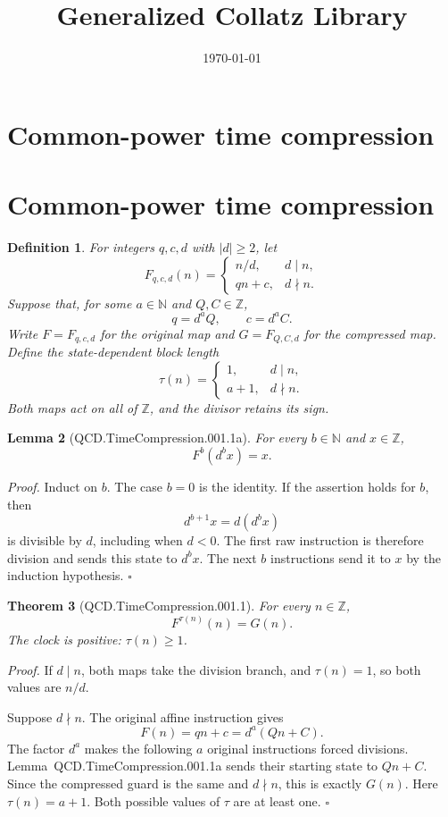 \documentclass[11pt,letterpaper]{article}
\title{Generalized Collatz Library}
\author{}
\date{\today}
\newcommand{\N}{\mathbb{N}}
\newcommand{\Z}{\mathbb{Z}}
\newtheorem{theorem}{Theorem}
\newtheorem{lemma}[theorem]{Lemma}
\newtheorem{definition}[theorem]{Definition}
\newenvironment{proof}{\noindent\textit{Proof.}}{\hfill\(\square\)}
\begin{document}
\maketitle
\section*{Common-power time compression}

\section{Common-power time compression}

\begin{definition}
For integers \(q,c,d\) with \(|d|\ge2\), let
\[
F_{q,c,d}(n)=
\begin{cases}
n/d,&d\mid n,\\
qn+c,&d\nmid n.
\end{cases}
\]
Suppose that, for some \(a\in\N\) and \(Q,C\in\Z\),
\[
q=d^aQ,
\qquad
c=d^aC.
\]
Write \(F=F_{q,c,d}\) for the original map and \(G=F_{Q,C,d}\) for the
compressed map. Define the state-dependent block length
\[
\tau(n)=
\begin{cases}
1,&d\mid n,\\
a+1,&d\nmid n.
\end{cases}
\]
Both maps act on all of \(\Z\), and the divisor retains its sign.
\end{definition}

\begin{lemma}[QCD.TimeCompression.001.1a]
For every \(b\in\N\) and \(x\in\Z\),
\[
F^b(d^b x)=x.
\]
\end{lemma}
\begin{proof}
Induct on \(b\). The case \(b=0\) is the identity. If the assertion holds for
\(b\), then
\[
d^{b+1}x=d(d^b x)
\]
is divisible by \(d\), including when \(d<0\). The first raw instruction is
therefore division and sends this state to \(d^b x\). The next \(b\)
instructions send it to \(x\) by the induction hypothesis.
\end{proof}

\begin{theorem}[QCD.TimeCompression.001.1]
For every \(n\in\Z\),
\[
F^{\tau(n)}(n)=G(n).
\]
The clock is positive: \(\tau(n)\ge1\).
\end{theorem}
\begin{proof}
If \(d\mid n\), both maps take the division branch, and \(\tau(n)=1\), so both
values are \(n/d\).

Suppose \(d\nmid n\). The original affine instruction gives
\[
F(n)=qn+c=d^a(Qn+C).
\]
The factor \(d^a\) makes the following \(a\) original instructions forced
divisions. Lemma~QCD.TimeCompression.001.1a sends their starting state to
\(Qn+C\). Since the compressed guard is the same and \(d\nmid n\), this is
exactly \(G(n)\). Here \(\tau(n)=a+1\). Both possible values of \(\tau\) are at
least one.
\end{proof}
\end{document}
